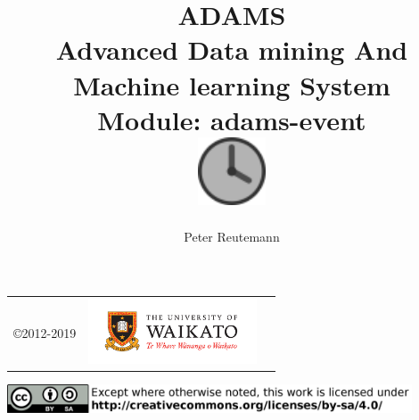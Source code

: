 \documentclass[a4paper]{book}
\title{
  \textbf{ADAMS} \\
  {\Large \textbf{A}dvanced \textbf{D}ata mining \textbf{A}nd \textbf{M}achine
  learning \textbf{S}ystem} \\
  {\Large Module: adams-event} \\
  \vspace{1cm}
  \includegraphics[width=2cm]{images/event-module.png} \\
}
\author{
  Peter Reutemann
}
\begin{document}
\begin{titlepage}
\maketitle

\thispagestyle{empty}
\center
\begin{table}[b]
	\begin{tabular}{c l l}
		\parbox[c][2cm]{2cm}{\copyright 2012-2019} &
		\parbox[c][2cm]{5cm}{\includegraphics[width=5cm]{images/coat_of_arms.pdf}} \\
	\end{tabular}
	\includegraphics[width=12cm]{images/cc.png} \\
\end{table}

\end{titlepage}

\tableofcontents
\listoffigures

\end{document}
